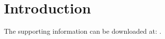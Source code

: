 \documentclass[journal,article,accept,pdftex,moreauthors]{mdpi}
\begin{document}
\section{Introduction}
The supporting information can be downloaded at: .
\end{document}
